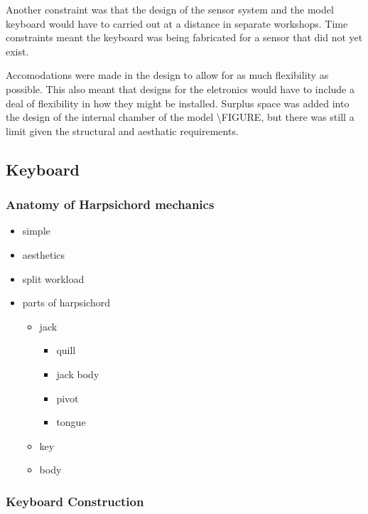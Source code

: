 Another constraint was that the design of the sensor system and the
model keyboard would have to carried out at a distance in separate
workshops. Time constraints meant the keyboard was being fabricated for
a sensor that did not yet exist.

Accomodations were made in the design to allow for as much flexibility
as possible. This also meant that designs for the eletronics would have
to include a deal of flexibility in how they might be installed. Surplus
space was added into the design of the internal chamber of the model
\textbackslash FIGURE, but there was still a limit given the structural
and aesthatic requirements.

\subsection{Keyboard}\label{keyboard}

\subsubsection{Anatomy of Harpsichord
mechanics}\label{anatomy-of-harpsichord-mechanics}

\begin{itemize}
\item
  simple
\item
  aesthetics
\item
  split workload
\item
  parts of harpsichord

  \begin{itemize}
  \item
    jack

    \begin{itemize}
    \item
      quill
    \item
      jack body
    \item
      pivot
    \item
      tongue
    \end{itemize}
  \item
    key
  \item
    body
  \end{itemize}
\end{itemize}

\subsubsection{Keyboard Construction}\label{keyboard-construction}

